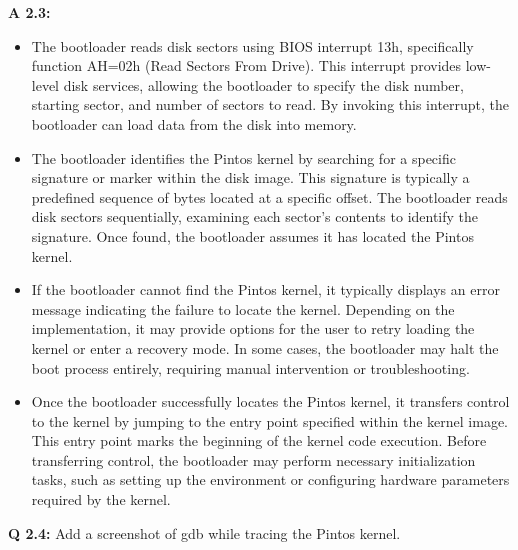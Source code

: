 \documentclass[a4paper,11pt]{paper}
\begin{document}
\textbf{A 2.3:}
\begin{itemize}
    \item The bootloader reads disk sectors using BIOS interrupt 13h, specifically function AH=02h (Read Sectors From Drive). This interrupt provides low-level disk services, allowing the bootloader to specify the disk number, starting sector, and number of sectors to read. By invoking this interrupt, the bootloader can load data from the disk into memory.
    \item The bootloader identifies the Pintos kernel by searching for a specific signature or marker within the disk image. This signature is typically a predefined sequence of bytes located at a specific offset. The bootloader reads disk sectors sequentially, examining each sector's contents to identify the signature. Once found, the bootloader assumes it has located the Pintos kernel.
    \item If the bootloader cannot find the Pintos kernel, it typically displays an error message indicating the failure to locate the kernel. Depending on the implementation, it may provide options for the user to retry loading the kernel or enter a recovery mode. In some cases, the bootloader may halt the boot process entirely, requiring manual intervention or troubleshooting.
    \item Once the bootloader successfully locates the Pintos kernel, it transfers control to the kernel by jumping to the entry point specified within the kernel image. This entry point marks the beginning of the kernel code execution. Before transferring control, the bootloader may perform necessary initialization tasks, such as setting up the environment or configuring hardware parameters required by the kernel.
\end{itemize}



\textbf{Q 2.4:} Add a screenshot of gdb while tracing the Pintos kernel.
\end{document}
